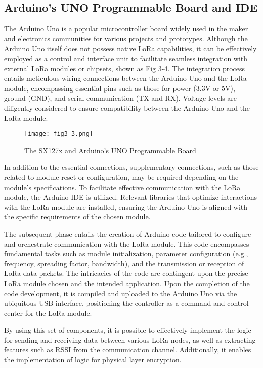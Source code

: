 \subsection{Arduino’s UNO Programmable Board and IDE}
The Arduino Uno is a popular microcontroller board widely used in the maker and electronics communities for various projects and prototypes. Although the Arduino Uno itself does not possess native LoRa capabilities, it can be effectively employed as a control and interface unit to facilitate seamless integration with external LoRa modules or chipsets, shown as Fig 3-4. The integration process entails meticulous wiring connections between the Arduino Uno and the LoRa module, encompassing essential pins such as those for power (3.3V or 5V), ground (GND), and serial communication (TX and RX). Voltage levels are diligently considered to ensure compatibility between the Arduino Uno and the LoRa module. 
\begin{figure}
  \centering
  \texttt{[image: fig3-3.png]}
  \caption{The SX127x and Arduino’s UNO Programmable Board}
  \label{fig:3-3}
\end{figure}
In addition to the essential connections, supplementary connections, such as those related to module reset or configuration, may be required depending on the module's specifications. To facilitate effective communication with the LoRa module, the Arduino IDE is utilized. Relevant libraries that optimize interactions with the LoRa module are installed, ensuring the Arduino Uno is aligned with the specific requirements of the chosen module.

The subsequent phase entails the creation of Arduino code tailored to configure and orchestrate communication with the LoRa module. This code encompasses fundamental tasks such as module initialization, parameter configuration (e.g., frequency, spreading factor, bandwidth), and the transmission or reception of LoRa data packets. The intricacies of the code are contingent upon the precise LoRa module chosen and the intended application. Upon the completion of the code development, it is compiled and uploaded to the Arduino Uno via the ubiquitous USB interface, positioning the controller as a command and control center for the LoRa module.

By using this set of components, it is possible to effectively implement the logic for sending and receiving data between various LoRa nodes, as well as extracting features such as RSSI from the communication channel. Additionally, it enables the implementation of logic for physical layer encryption.


